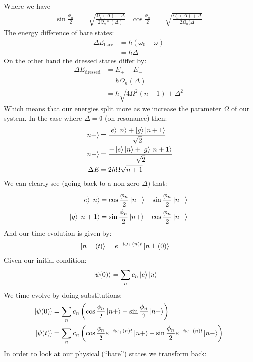Where we have:
\begin{align*}
	\sin\frac{\phi_n}{2} &= \sqrt{\frac{\Omega_n(\Delta)-\Delta}{2\Omega_n*(\Delta)}} & \cos\frac{\phi_n}{2} &= \sqrt{\frac{\Omega_n(\Delta)+ \Delta}{2\Omega_n(\Delta}}
\end{align*}
The energy difference of bare states:
\begin{align*}
	\Delta E_\text{bare} &= \hbar(\omega_0-\omega) \\
	&= \hbar\Delta
\end{align*}
On the other hand the dressed states differ by:
\begin{align*}
	\Delta E_\text{dressed} &= E_+ - E_- \\
	&= \hbar\Omega_n(\Delta) \\
	&= \hbar\sqrt{4\Omega^2(n+1) + \Delta^2}
\end{align*}
Which means that our energies split more as we increase the parameter $\Omega$ of our system. In the case where $\Delta = 0$ (on resonance) then:
\begin{align*}
	\ket{n+} &= \frac{\ket{e}\ket{n} + \ket{g}\ket{n+1}}{\sqrt{2}} \\
	\ket{n-} &= \frac{-\ket{e}\ket{n} + \ket{g}\ket{n+1}}{\sqrt{2}} \\
	\Delta E &= 2\hbar\Omega\sqrt{n+1}
\end{align*}
We can clearly see (going back to a non-zero $\Delta$) that:
\begin{align*}
	\ket{e}\ket{n} &= \cos\frac{\phi_n}{2}\ket{n+} - \sin\frac{\phi_n}{2}\ket{n-} \\
	\ket{g}\ket{n+1} &= \sin\frac{\phi_n}{2}\ket{n+} + \cos\frac{\phi_n}{2}\ket{n-}
\end{align*}
And our time evolution is given by:
\begin{align*}
	\ket{n\pm(t)} &= e^{-i\omega_\pm(n) t} \ket{n\pm(0)}
\end{align*}
Given our initial condition:
\begin{align*}
	\ket{\psi(0)} &= \sum_n c_n \ket{e}\ket{n}
\end{align*}
We time evolve by doing substitutions:
\begin{align*}
	\ket{\psi(0)} &= \sum_n c_n \left(\cos\frac{\phi_n}{2}\ket{n+} - \sin\frac{\phi_n}{2}\ket{n-}\right) \\
	\ket{\psi(t)} &= \sum_n c_n \left(\cos\frac{\phi_n}{2}e^{-i\omega_+(n) t}\ket{n+} - \sin\frac{\phi_n}{2}e^{-i\omega_-(n) t}\ket{n-}\right)
\end{align*}
In order to look at our physical (``bare'') states we transform back:
